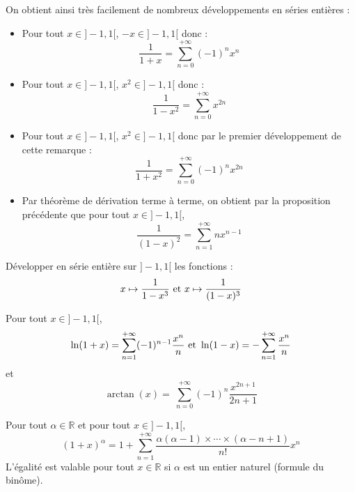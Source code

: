 \documentclass[french,11pt,twoside]{VcCours}
\begin{document}
\begin{Remarque}{} On obtient ainsi très facilement de nombreux développements en séries entières :

\begin{itemize}
\item Pour tout $x \in ]-1,1[$, $-x \in ]-1,1[$ donc :
$$ \dfrac{1}{1+x} = \sum_{n=0}^{+ \infty} (-1)^n x^n$$
\item Pour tout $x \in ]-1,1[$, $x^2 \in ]-1,1[$ donc :
$$ \dfrac{1}{1-x^2}=  \sum_{n=0}^{+ \infty} x^{2n}$$
\item Pour tout $x \in ]-1,1[$, $x^2 \in ]-1,1[$ donc par le premier développement de cette remarque :
$$ \dfrac{1}{1+x^2} = \sum_{n=0}^{+ \infty} (-1)^n x^{2n}$$
\item Par théorème de dérivation terme à terme, on obtient par la proposition précédente que pour tout $x \in ]-1,1[$,
$$ \dfrac{1}{(1-x)^2} = \sum_{n=1}^{+ \infty} n x^{n-1}$$
\end{itemize}
\end{Remarque}

\begin{ApplicationDirecte}{} Développer en série entière sur $]-1,1[$ les fonctions :
$$ x \mapsto \dfrac{1}{1-x^3} \hbox{ et } x \mapsto \dfrac{1}{(1-x)^3}$$
\end{ApplicationDirecte}

\begin{Proposition}{} Pour tout $x \in ]-1,1[$,
$$ \ln(1+x) = \sum_{n=1}^{+ \infty} (-1)^{n-1} \dfrac{x^n}{n} \hbox{ et } \ln(1-x) = -\sum_{n=1}^{+ \infty} \dfrac{x^n}{n}$$
et 
$$ \arctan(x)= \ \sum_{n=0}^{+ \infty} (-1)^n \frac{x^{2n+1}}{2n+1} $$
\end{Proposition}

\begin{Demonstration}{}
\newpage

\vspace*{ 5cm}
\end{Demonstration}

\begin{Theoreme}{} Pour tout $\alpha \in \mathbb{R}$ et pour tout $x \in ]-1,1[$,
$$ (1+x)^{\alpha} = 1 + \sum_{n=1}^{+ \infty} \dfrac{\alpha (\alpha-1) \times \cdots \times (\alpha-n+1)}{n!} x^n$$
L'égalité est valable pour tout $x \in \mathbb{R}$ si $\alpha$ est un entier naturel (formule du binôme).
\end{Theoreme}

\begin{Demonstration}{}



\vspace*{ 12cm}

\end{Demonstration}
\end{document}

